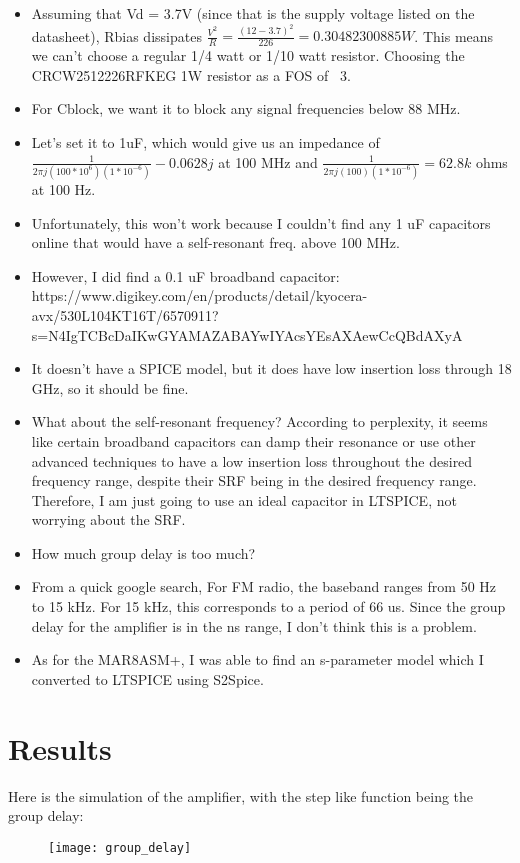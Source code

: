 \documentclass[12pt, letterpaper]{article}
\begin{document}
\begin{itemize}
    \item Assuming that Vd = 3.7V (since that is the supply voltage listed on the datasheet), Rbias dissipates \(\frac{V^2}{R} = \frac{(12-3.7)^2}{226} = 0.30482300885 W\). This means we can't choose a regular 1/4 watt or 1/10 watt resistor. Choosing the CRCW2512226RFKEG 1W resistor as a FOS of ~3. 
    \item For Cblock, we want it to block any signal frequencies below 88 MHz. 
    \item Let's set it to 1uF, which would give us an impedance of \(\frac{1}{2\pi j (100*10^6) (1*10^{-6})} -0.0628j \) at 100 MHz and \(\frac{1}{2\pi j (100) (1*10^{-6})} = 62.8k\) ohms at 100 Hz.
    \item Unfortunately, this won't work because I couldn't find any 1 uF capacitors online that would have a self-resonant freq. above 100 MHz.
    \item However, I did find a 0.1 uF broadband capacitor: https://www.digikey.com/en/products/detail/kyocera-avx/530L104KT16T/6570911?s=N4IgTCBcDaIKwGYAMAZABAYwIYAcsYEsAXAewCcQBdAXyA
    \item It doesn't have a SPICE model, but it does have low insertion loss through 18 GHz, so it should be fine.
    \item What about the self-resonant frequency? According to perplexity, it seems like certain broadband capacitors can damp their resonance or use other advanced techniques to have a low insertion loss throughout the desired frequency range, despite their SRF being in the desired frequency range. Therefore, I am just going to use an ideal capacitor in LTSPICE, not worrying about the SRF.
    \item How much group delay is too much?
    \item From a quick google search, For FM radio, the baseband ranges from 50 Hz to 15 kHz. For 15 kHz, this corresponds to a period of 66 us. Since the group delay for the amplifier is in the ns range, I don't think this is a problem.
    \item As for the MAR8ASM+, I was able to find an s-parameter model which I converted to LTSPICE using S2Spice.
\end{itemize}

\section{Results}
Here is the simulation of the amplifier, with the step like function being the group delay:
\begin{figure}[h]
\texttt{[image: group\_delay]}
\end{figure}
\end{document}
